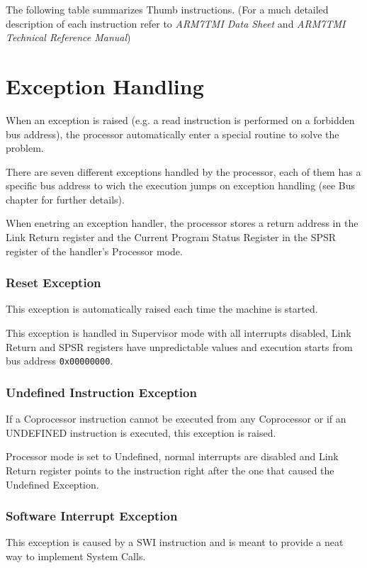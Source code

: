 The following table summarizes Thumb instructions. (For a much detailed description of each instruction refer to \emph{ARM7TMI Data Sheet} and \emph{ARM7TMI Technical Reference Manual})



\section{Exception Handling}

When an exception is raised (e.g. a read instruction is performed on a forbidden bus address), the processor automatically enter a special routine to solve the problem. 

There are seven different exceptions handled by the processor, each of them has a specific bus address to wich the execution jumps on exception handling (see Bus chapter for further details).

When enetring an exception handler, the processor stores a return address in the Link Return register and the Current Program Status Register in the SPSR register of the handler's Processor mode.

\subsubsection{Reset Exception}
This exception is automatically raised each time the machine is started. 

This exception is handled in Supervisor mode with all interrupts disabled, Link Return and SPSR registers have unpredictable values and execution starts from bus address \texttt{0x00000000}.

\subsubsection{Undefined Instruction Exception}
If a Coprocessor instruction cannot be executed from any Coprocessor or if an UNDEFINED instruction is executed, this exception is raised. 

Processor mode is set to Undefined, normal interrupts are disabled and Link Return register points to the instruction right after the one that caused the Undefined Exception.

\subsubsection{Software Interrupt Exception}
This exception is caused by a SWI instruction and is meant to provide a neat way to implement System Calls. 

